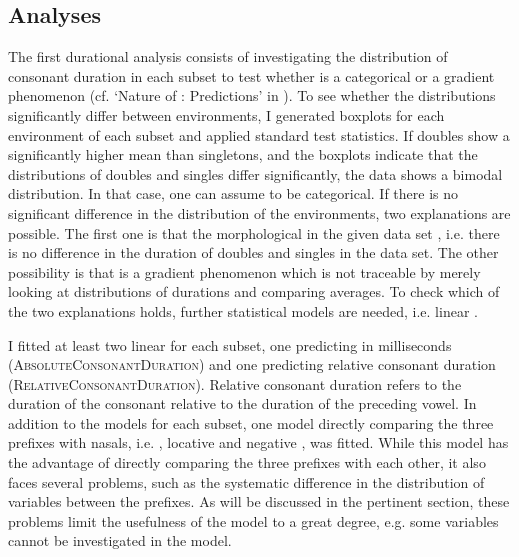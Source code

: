 \subsection{Analyses} \label{analyses dur corpus}


The first durational analysis consists of investigating the distribution of consonant duration in each subset to test whether  is a categorical or a gradient phenomenon (cf. `Nature of : Predictions' in ). To see whether the distributions significantly differ between environments, I generated boxplots for each environment of each subset and applied standard test statistics. 
If doubles show a significantly higher mean than singletons, and the boxplots indicate that the distributions of doubles and singles differ significantly, the data shows a bimodal distribution. In that case, one can assume  to be categorical. 
If there is no significant difference in the distribution of the environments, two explanations are possible. The first one is that the morphological  in the given data set , i.e. there is no difference in the duration of doubles and singles in the data set. The other possibility is that  is a gradient phenomenon which is not traceable by merely looking at distributions of durations and comparing averages. To check which of the two explanations holds, further statistical models are needed, i.e. linear . 



I fitted at least two linear  for each subset, one predicting  in milliseconds  (\textsc{AbsoluteConsonantDuration}) and one predicting relative consonant duration (\textsc{RelativeConsonantDuration}). Relative consonant duration refers to the duration of the consonant relative to the duration of the preceding vowel. In addition to the models for each subset, one model directly comparing the three prefixes with nasals, i.e. , locative  and negative , was fitted. While this model has the advantage of directly comparing the three prefixes with each other, it also faces several problems, such as the systematic difference in the distribution of variables between the prefixes. As will be discussed in the pertinent section, these problems limit the usefulness of the model to a great degree, e.g. some variables cannot be investigated in the model.

